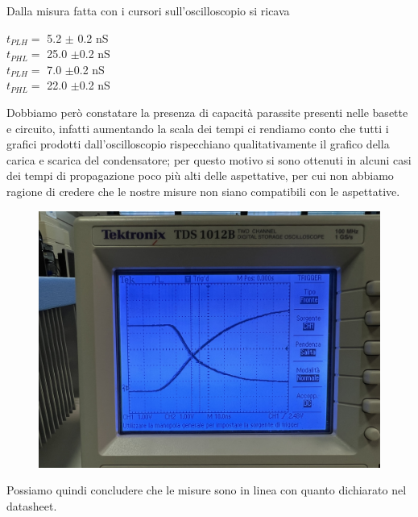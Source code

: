 \documentclass[10pt, a4paper, italian]{article}
\begin{document}
Dalla misura fatta con i cursori sull'oscilloscopio si ricava
\begin{multicols}{2}
    \centering
    $t_{PLH}=$ 5.2 $\pm$ 0.2 nS\\
    $t_{PHL}=$ 25.0 $\pm$0.2 nS\\
    
    
    $t_{PLH}=$ 7.0 $\pm$0.2 nS\\
    $t_{PHL}=$ 22.0 $\pm$0.2 nS\\
\end{multicols}
Dobbiamo però constatare la presenza di capacità parassite presenti nelle basette e circuito, infatti aumentando la scala dei tempi ci rendiamo conto che tutti i grafici prodotti dall'oscilloscopio rispecchiano qualitativamente il grafico della carica e scarica del condensatore; per questo motivo si sono ottenuti in alcuni casi dei tempi di propagazione poco più alti delle aspettative, per cui non abbiamo ragione di credere che le nostre misure non siano compatibili con le aspettative.
\begin{figure}
	\includegraphics[width=\textwidth]{carica}
\end{figure}
Possiamo quindi concludere che le misure sono in linea con quanto dichiarato nel datasheet.
\end{document}
